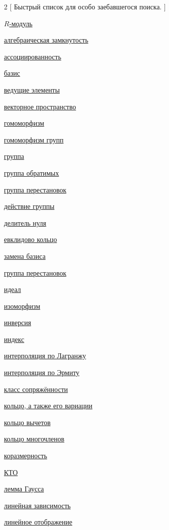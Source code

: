 \documentclass[a4paper,100pt]{article}
\theoremstyle{indented}
\theoremstyle{definition}
\theoremstyle{remark}
\begin{document}
\begin{multicols}{2}
    [
    Быстрый список для особо заебавшегося поиска.
    ]

    \hyperlink{n42}{$R$-модуль}\
    
    \hyperlink{n39}{алгебраическая замкнутость}\
    
    \hyperlink{n4}{ассоциированность}\

    \hyperlink{n45}{базис}\

    \hyperlink{n61}{ведущие элементы}\

    \hyperlink{n46}{векторное пространство}\

    \hyperlink{n19}{гомоморфизм}\

    \hyperlink{n86}{гомоморфизм групп}\

    \hyperlink{n66}{группа}\

    \hyperlink{n84}{группа обратимых}\

    \hyperlink{n72}{группа перестановок}\

    \hyperlink{n78}{действие группы}\
    
    \hyperlink{n3}{делитель нуля}\

    \hyperlink{n5}{евклидово кольцо}\

    \hyperlink{n54}{замена базиса}\

    \hyperlink{n77}{группа перестановок}\

    \hyperlink{n9}{идеал}\

    \hyperlink{n22}{изоморфизм}\

    \hyperlink{n76}{инверсия}\

    \hyperlink{n89}{индекс}\

    \hyperlink{n35}{интерполяция по Лагранжу}\

    \hyperlink{n36}{интерполяция по Эрмиту}\

    \hyperlink{n83}{класс сопряжённости}\
    
    \hyperlink{n1}{кольцо, а также его вариации}\

    \hyperlink{n14}{кольцо вычетов}\

    \hyperlink{n28}{кольцо многочленов}\

    \hyperlink{n51}{коразмерность}\

    \hyperlink{n15}{КТО}\

    \hyperlink{n31}{лемма Гаусса}\

    \hyperlink{n43}{линейная зависимость}\

    \hyperlink{n48}{линейное отображение}\


\end{multicols}
\end{document}
